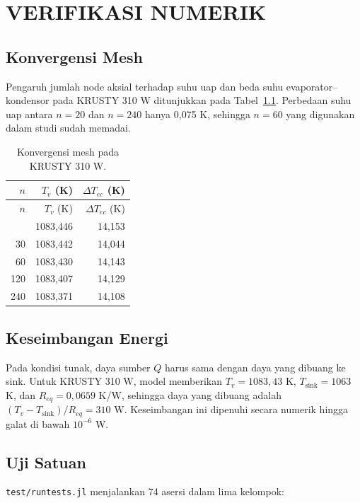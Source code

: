 \documentclass[
  indonesian,
  12pt,
  a4paper,
]{report}
\begin{document}
\chapter{VERIFIKASI NUMERIK}\label{verifikasi-numerik}

\section{Konvergensi Mesh}\label{konvergensi-mesh}

Pengaruh jumlah node aksial terhadap suhu uap dan beda suhu
evaporator--kondensor pada KRUSTY 310 W ditunjukkan pada
Tabel~\ref{tbl-mesh}. Perbedaan suhu uap antara \(n=20\) dan \(n=240\)
hanya 0,075 K, sehingga \(n=60\) yang digunakan dalam studi sudah
memadai.

\begin{longtable}[]{@{}rrr@{}}
\caption{Konvergensi mesh pada KRUSTY 310
W.}\label{tbl-mesh}\tabularnewline
\toprule\noalign{}
\(n\) & \(T_v\) (K) & \(\Delta T_{ec}\) (K) \\
\midrule\noalign{}
\endfirsthead
\toprule\noalign{}
\(n\) & \(T_v\) (K) & \(\Delta T_{ec}\) (K) \\
\midrule\noalign{}
\endhead
\bottomrule\noalign{}
\endlastfoot
20 & 1083,446 & 14,153 \\
30 & 1083,442 & 14,044 \\
60 & 1083,430 & 14,143 \\
120 & 1083,407 & 14,129 \\
240 & 1083,371 & 14,108 \\
\end{longtable}

\section{Keseimbangan Energi}\label{keseimbangan-energi}

Pada kondisi tunak, daya sumber \(Q\) harus sama dengan daya yang
dibuang ke sink. Untuk KRUSTY 310 W, model memberikan \(T_v=1083{,}43\)
K, \(T_{\mathrm{sink}}=1063\) K, dan \(R_{eq}=0{,}0659\) K/W, sehingga
daya yang dibuang adalah \((T_v-T_{\mathrm{sink}})/R_{eq}=310\) W.
Keseimbangan ini dipenuhi secara numerik hingga galat di bawah
\(10^{-6}\) W.

\section{Uji Satuan}\label{uji-satuan}

\texttt{test/runtests.jl} menjalankan 74 asersi dalam lima kelompok:
\end{document}
